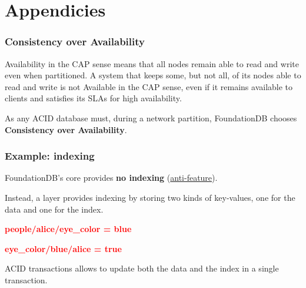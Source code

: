 \section{Appendicies}


\begin{frame}
	\frametitle{Consistency over Availability}

 Availability in the CAP sense means that all nodes remain able to read and write even when partitioned. A system that keeps some, but not all, of its nodes able to read and write is not Available in the CAP sense, even if it remains available to clients and satisfies its SLAs for high availability.
\vspace{0.5cm}

As any ACID database must, during a network partition, FoundationDB chooses \textbf{Consistency over Availability}. 

\end{frame}


\begin{frame}
	\frametitle{Example: indexing}

FoundationDB’s core provides \textbf{no indexing}  (\href{https://apple.github.io/foundationdb/anti-features.html}{anti-feature}).

Instead, a layer provides indexing by storing two kinds of key-values, one for the data and one for the index.

\begin{center}
\textbf{\textcolor{red}{people/alice/eye\_color = blue}}
\end{center}

\begin{center}
\textbf{\textcolor{red}{eye\_color/blue/alice = true}}
\end{center}

ACID transactions allows to update both the data and the index in a single transaction.
\end{frame}


